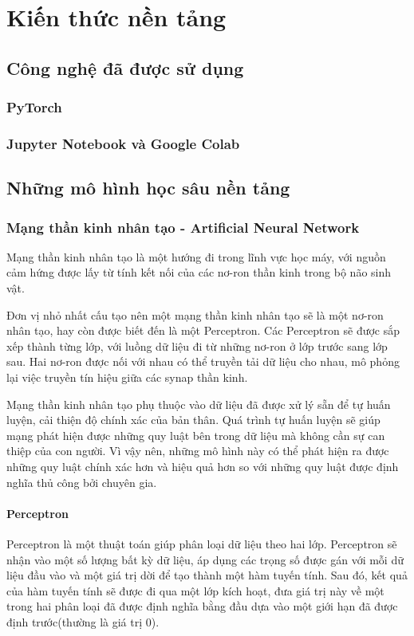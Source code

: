 \chapter{Kiến thức nền tảng}
\section{Công nghệ đã được sử dụng}
\subsection*{PyTorch}
\subsection*{Jupyter Notebook và Google Colab}
\section{Những mô hình học sâu nền tảng}
\subsection{Mạng thần kinh nhân tạo - Artificial Neural Network}
Mạng thần kinh nhân tạo là một hướng đi trong lĩnh vực học máy, với nguồn cảm hứng được lấy từ tính kết nối của các nơ-ron thần kinh trong bộ não sinh vật.

Đơn vị nhỏ nhất cấu tạo nên một mạng thần kinh nhân tạo sẽ là một nơ-ron nhân tạo, hay còn được biết đến là một Perceptron. Các Perceptron sẽ được sắp xếp thành từng lớp, với luồng dữ liệu đi từ những nơ-ron ở lớp trước sang lớp sau. Hai nơ-ron được nối với nhau có thể truyền tải dữ liệu cho nhau, mô phỏng lại việc truyền tín hiệu giữa các synap thần kinh.

Mạng thần kinh nhân tạo phụ thuộc vào dữ liệu đã được xử lý sẵn để tự huấn luyện, cải thiện độ chính xác của bản thân. Quá trình tự huấn luyện sẽ giúp mạng phát hiện được những quy luật bên trong dữ liệu mà không cần sự can thiệp của con người. Vì vậy nên, những mô hình này có thể phát hiện ra được những quy luật chính xác hơn và hiệu quả hơn so với những quy luật được định nghĩa thủ công bởi chuyên gia. 
\subsubsection*{Perceptron}
Perceptron là một thuật toán giúp phân loại dữ liệu theo hai lớp. Perceptron sẽ nhận vào một số lượng bất kỳ dữ liệu, áp dụng các trọng số được gán với mỗi dữ liệu đầu vào và một giá trị dời để tạo thành một hàm tuyến tính. Sau đó, kết quả của hàm tuyến tính sẽ được đi qua một lớp kích hoạt, đưa giá trị này về một trong hai phân loại đã được định nghĩa bằng đầu dựa vào một giới hạn đã được định trước(thường là giá trị 0).

